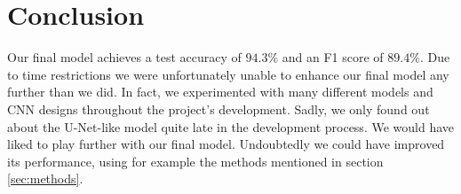\documentclass[10pt,conference,compsocconf]{IEEEtran}
\begin{document}
\bigskip
\bigskip

\section{Conclusion}
\label{sec:conclusion}

Our final model achieves a test accuracy of $94.3\%$ and an F1 score of $89.4\%$. Due to time restrictions we were unfortunately unable to enhance our final model any further than we did. In fact, we experimented with many different models and CNN designs throughout the project's development. Sadly, we only found out about the U-Net-like model quite late in the development process. We would have liked to play further with our final model. Undoubtedly we could have improved its performance, using for example the methods mentioned in section \ref{sec:methods}.





\end{document}
